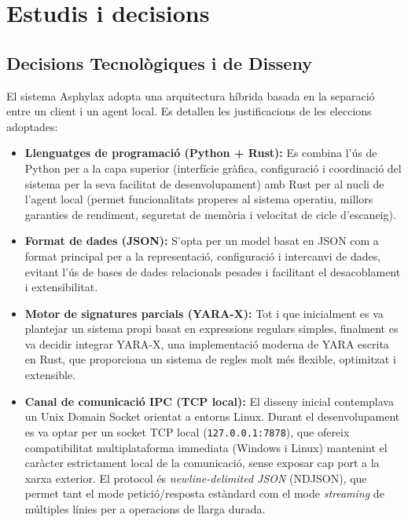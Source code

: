 \documentclass[12pt,a4paper]{report}
\begin{document}
\chapter{Estudis i decisions}
\label{ch:estudisdecisions}

\section{Decisions Tecnològiques i de Disseny}
El sistema Asphylax adopta una arquitectura híbrida basada en la separació entre un client i un agent local. Es detallen les justificacions de les eleccions adoptades:

\begin{itemize}
    \item \textbf{Llenguatges de programació (Python + Rust):} Es combina l'ús de Python per a la capa superior (interfície gràfica, configuració i coordinació del sistema per la seva facilitat de desenvolupament) amb Rust per al nucli de l'agent local (permet funcionalitats properes al sistema operatiu, millors garanties de rendiment, seguretat de memòria i velocitat de cicle d'escaneig).
    \item \textbf{Format de dades (JSON):} S'opta per un model basat en JSON com a format principal per a la representació, configuració i intercanvi de dades, evitant l'ús de bases de dades relacionals pesades i facilitant el desacoblament i extensibilitat.
    \item \textbf{Motor de signatures parcials (YARA-X):} Tot i que inicialment es va plantejar un sistema propi basat en expressions regulars simples, finalment es va decidir integrar YARA-X, una implementació moderna de YARA escrita en Rust, que proporciona un sistema de regles molt més flexible, optimitzat i extensible.
    \item \textbf{Canal de comunicació IPC (TCP local):} El disseny inicial contemplava un Unix Domain Socket orientat a entorns Linux. Durant el desenvolupament es va optar per un socket TCP local (\texttt{127.0.0.1:7878}), que ofereix compatibilitat multiplataforma immediata (Windows i Linux) mantenint el caràcter estrictament local de la comunicació, sense exposar cap port a la xarxa exterior. El protocol és \textit{newline-delimited JSON} (NDJSON), que permet tant el mode petició/resposta estàndard com el mode \textit{streaming} de múltiples línies per a operacions de llarga durada.

\end{itemize}
\end{document}
